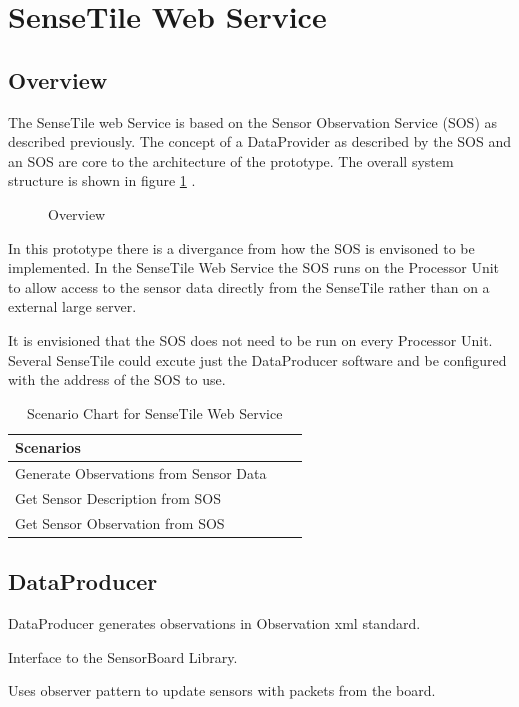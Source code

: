 \documentclass[]{final_report}
\begin{document}
\section{SenseTile Web Service}
\subsection{Overview}

The SenseTile web Service is based on the Sensor Observation Service (SOS) as described previously. The concept of a DataProvider as described by the SOS and an SOS are core to the architecture of the prototype. The overall system structure is shown in figure \ref {fig:SystemOverview} .

\begin{figure}[h]
\caption{Overview}\label{fig:SystemOverview}
\end{figure}
In this prototype there is a divergance from how the SOS is envisoned to be implemented. In the SenseTile Web Service the SOS runs on the Processor Unit to allow access to the sensor data directly from the SenseTile rather than on a external large server. 

It is envisioned that the SOS does not need to be run on every Processor Unit. Several SenseTile could excute just the DataProducer software and be configured with the address of the SOS to use.

\begin{table}[!th]
\begin{tabular}{|l|c|r|}
\hline

Scenarios\\
\hline
Generate Observations from Sensor Data \\
\hline
Get Sensor Description from SOS\\
\hline
Get  Sensor Observation from SOS\\
\hline
\end{tabular}
\caption{Scenario Chart for SenseTile Web Service}
\label{ex:table}
\end{table}

\subsection{DataProducer}

DataProducer generates observations in Observation xml standard.

Interface to the SensorBoard Library.

Uses observer pattern to update sensors with packets from the board.
\end{document}
